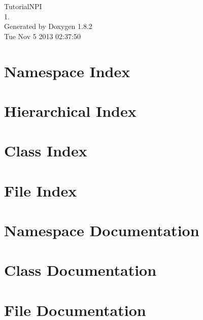 \documentclass{book}
\begin{document}
\hypersetup{pageanchor=false,citecolor=blue}
\begin{titlepage}
\vspace*{7cm}
\begin{center}
{\Large Tutorial\-N\-P\-I \\[1ex]\large 1. }\\
\vspace*{1cm}
{\large Generated by Doxygen 1.8.2}\\
\vspace*{0.5cm}
{\small Tue Nov 5 2013 02:37:50}\\
\end{center}
\end{titlepage}
\clearemptydoublepage
{}
\tableofcontents
\clearemptydoublepage
{}
\hypersetup{pageanchor=true,citecolor=blue}
\chapter{Namespace Index}

\chapter{Hierarchical Index}

\chapter{Class Index}

\chapter{File Index}

\chapter{Namespace Documentation}



\chapter{Class Documentation}









\chapter{File Documentation}









\printindex
\end{document}
